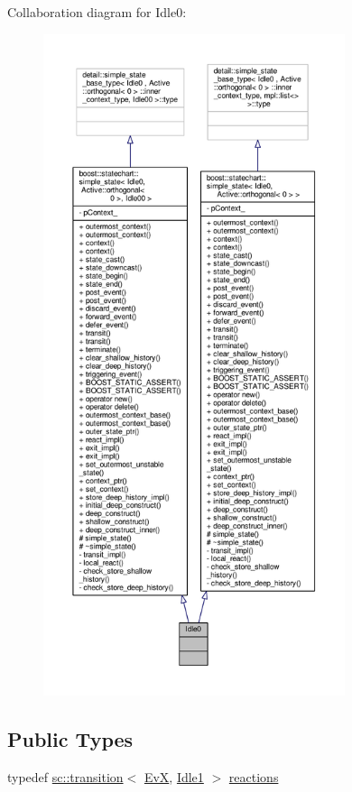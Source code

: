 Collaboration diagram for Idle0\+:
\nopagebreak
\begin{figure}[H]
\begin{center}
\leavevmode
\includegraphics[height=550pt]{struct_idle0__coll__graph}
\end{center}
\end{figure}
\subsection*{Public Types}
\begin{DoxyCompactItemize}
\item 
typedef \mbox{\hyperlink{classboost_1_1statechart_1_1transition}{sc\+::transition}}$<$ \mbox{\hyperlink{struct_ev_x}{EvX}}, \mbox{\hyperlink{struct_idle1}{Idle1}} $>$ \mbox{\hyperlink{struct_idle0_ab136e60f9bce243bd44aab0302320b11}{reactions}}
\end{DoxyCompactItemize}
